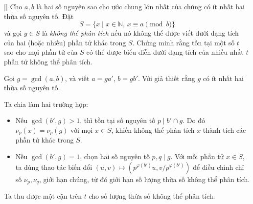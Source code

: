 \documentclass[../06-largest-exponent.tex]{subfiles}
\begin{document}
\begin{example*}\label{example:CHN-2015-TST3-D1-P3}[\textbf{}]
	Cho \( a, b \) là hai số nguyên sao cho ước chung lớn nhất của chúng có ít nhất hai thừa số nguyên tố.  
	Đặt  
	\[
		S = \{ x \mid x \in \mathbb{N},\, x \equiv a \pmod{b} \}
	\]
	và gọi \( y \in S \) là \textit{không thể phân tích} nếu nó không thể được viết
	dưới dạng tích của hai (hoặc nhiều) phần tử khác trong \( S \).  
	Chứng minh rằng tồn tại một số \( t \) sao cho mọi phần tử của \( S \) có thể được biểu diễn
	dưới dạng tích của nhiều nhất \( t \) phần tử không thể phân tích.
\end{example*}

\begin{story*}
	Gọi \(g=\gcd(a,b)\), và viết \(a = ga'\), \(b = gb'\). Với giả thiết rằng \(g\) có ít nhất hai thừa số nguyên tố.

	Ta chia làm hai trường hợp:
	\begin{itemize}[topsep=0pt, partopsep=0pt, itemsep=0pt]
		\item Nếu \( \gcd(b', g) > 1 \), thì tồn tại số nguyên tố \( p \mid b' \cap g \). Do đó \( \nu_p(x) = \nu_p(g) \) với mọi \( x \in S \), khiến không thể phân tích \( x \) thành tích các phần tử khác trong \( S \).
		\item Nếu \( \gcd(b', g) = 1 \), chọn hai số nguyên tố \( p, q \mid g \). Với mỗi phần tử \( x \in S \), ta dùng thao tác biến đổi \( (u, v) \mapsto (p^{\varphi(b')}u, v/p^{\varphi(b')}) \) để điều chỉnh chỉ số \( \nu_p, \nu_q \), giới hạn chúng, từ đó giới hạn số lượng thừa số không thể phân tích.
	\end{itemize}
	Ta thu được một cận trên \( t \) cho số lượng thừa số không thể phân tích.
\end{story*}
\end{document}

